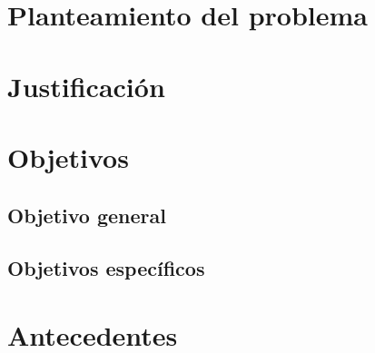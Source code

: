 \section{Planteamiento del problema}

\section{Justificación}

\section{Objetivos}

\subsection{Objetivo general}

\subsection{Objetivos específicos}

\section{Antecedentes}

